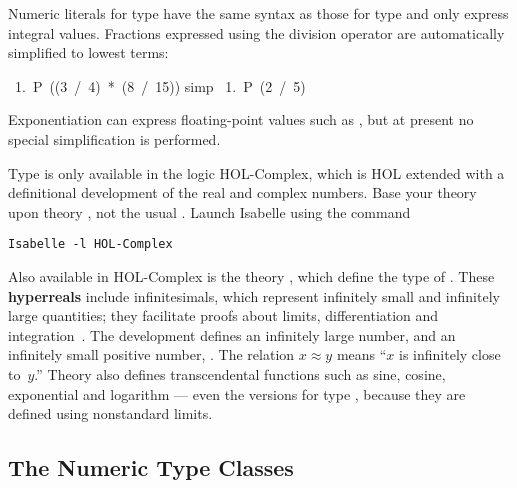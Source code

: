 Numeric literals
for type  have the same syntax as those for type
 and only express integral values.  Fractions expressed
using the division operator are automatically simplified to lowest terms:
\begin{isabelle}
\ 1.\ P\ ((3\ /\ 4)\ *\ (8\ /\ 15))\isanewline
{} simp\isanewline
\ 1.\ P\ (2\ /\ 5)
\end{isabelle}
Exponentiation can express floating-point values such as
, but at present no special simplification
is performed.

\begin{warn}
Type  is only available in the logic HOL-Complex, which
is  HOL extended with a definitional development of the real and complex
numbers.  Base your theory upon theory
, not the usual .%
Launch Isabelle using the command 
\begin{verbatim}
Isabelle -l HOL-Complex
\end{verbatim}
\end{warn}

Also available in HOL-Complex is the
theory , which define the type  of 
.  These
\textbf{hyperreals} include infinitesimals, which represent infinitely
small and infinitely large quantities; they facilitate proofs
about limits, differentiation and integration~\cite{fleuriot-jcm}.  The
development defines an infinitely large number,  and an
infinitely small positive number, .  The 
relation $x\approx y$ means ``$x$ is infinitely close to~$y$.''
Theory  also defines transcendental functions such as sine,
cosine, exponential and logarithm --- even the versions for type
, because they are defined using nonstandard limits.%
%
%


\subsection{The Numeric Type Classes}\label{sec:numeric-axclasses}

